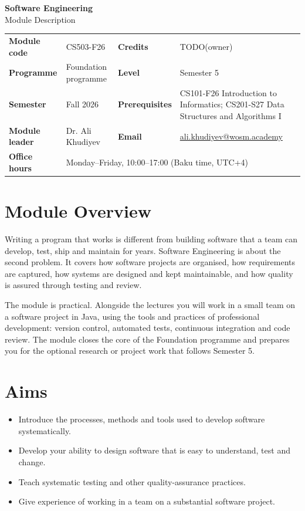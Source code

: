 \documentclass[11pt,a4paper]{article}
\makeatletter
\newcommand{\ModuleTitle}{Software Engineering}
\newcommand{\ModuleCode}{CS503-F26}
\newcommand{\Programme}{Foundation programme}
\newcommand{\Level}{Semester 5}
\newcommand{\Semester}{Fall 2026}
\newcommand{\Credits}{TODO(owner)}
\newcommand{\ModuleLeader}{Dr. Ali Khudiyev}
\newcommand{\Email}{ali.khudiyev@wosm.academy}
\newcommand{\OfficeHours}{Monday--Friday, 10:00--17:00 (Baku time, UTC+4)}
\newcommand{\Prerequisites}{CS101-F26 Introduction to Informatics; CS201-S27 Data Structures and Algorithms I}
\makeatother
\begin{document}
\begin{center}
  {\LARGE\bfseries\color{accent} \ModuleTitle}\\[4pt]
  {\large Module Description}
\end{center}
\vspace{6pt}

\begin{tabularx}{\textwidth}{>{\bfseries}l X >{\bfseries}l X}
\toprule
Module code   & \ModuleCode    & Credits      & \Credits \\
Programme     & \Programme     & Level        & \Level \\
Semester      & \Semester      & Prerequisites & \Prerequisites \\
Module leader & \ModuleLeader  & Email        & \href{mailto:\Email}{\Email} \\
Office hours  & \multicolumn{3}{l}{\OfficeHours} \\
\bottomrule
\end{tabularx}

\section{Module Overview}
Writing a program that works is different from building software that a team can
develop, test, ship and maintain for years. Software Engineering is about the second
problem. It covers how software projects are organised, how requirements are
captured, how systems are designed and kept maintainable, and how quality is
assured through testing and review.

The module is practical. Alongside the lectures you will work in a small team on a
software project in Java, using the tools and practices of professional development:
version control, automated tests, continuous integration and code review. The module
closes the core of the Foundation programme and prepares you for the optional
research or project work that follows Semester 5.

\section{Aims}
\begin{itemize}
  \item Introduce the processes, methods and tools used to develop software systematically.
  \item Develop your ability to design software that is easy to understand, test and change.
  \item Teach systematic testing and other quality-assurance practices.
  \item Give experience of working in a team on a substantial software project.
\end{itemize}
\end{document}
